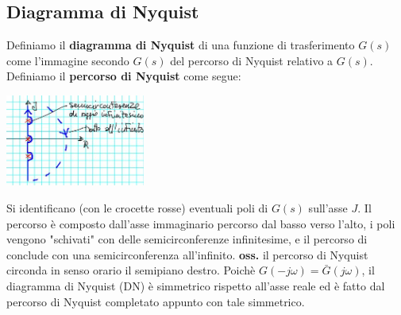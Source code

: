 \subsection{Diagramma di Nyquist}
Definiamo il \textbf{diagramma di Nyquist} di una funzione di trasferimento $G(s)$ come l'immagine secondo $G(s)$ del percorso di Nyquist relativo a $G(s)$.\newline
\newline
Definiamo il \textbf{percorso di Nyquist} come segue:
\begin{center}
    \includegraphics[height=3cm]{../lezione18/img7.JPG}
\end{center}
Si identificano (con le crocette rosse) eventuali poli di $G(s)$ sull'asse $J$. Il percorso è composto dall'asse immaginario percorso dal basso verso l'alto, i poli vengono "schivati" con delle semicirconferenze infinitesime, e il percorso di conclude con una semicirconferenza all'infinito.\newline
\newline
\textbf{oss.} il percorso di Nyquist circonda in senso orario il semipiano destro.\newline
\newline
Poichè $G(-j \omega) = \bar{G}(j \omega)$, il diagramma di Nyquist (DN) è simmetrico rispetto all'asse reale ed è fatto dal percorso di Nyquist completato appunto con tale simmetrico.
